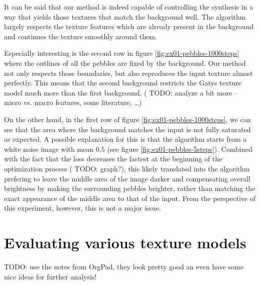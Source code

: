 It can be said that our method is indeed capable of controlling the synthesis in a way that yields those textures that match the background well. The algorithm largely respects the texture features which are already present in the background and continues the texture smoothly around them. 

Especially interesting is the second row in figure \ref{fig:ex01-pebbles-1000steps} where the outlines of all the pebbles are fixed by the background. Our method not only respects those boundaries, but also reproduces the input texture almost perfectly. This means that the second background restricts the Gatys texture model much more than the first background. ({\color{red} TODO: analyze a bit more -- micro vs. macro features, some literature, \dots})

On the other hand, in the first row of figure \ref{fig:ex01-pebbles-1000steps}, we can see that the area where the background matches the input is not fully saturated as expected. A possible explanation for this is that the algorithm starts from a white noise image with mean \(0.5\) (see figure \ref{fig:ex01-pebbles-5steps}). Combined with the fact that the loss decreases the fastest at the beginning of the optimization process ({\color{red} TODO: graph?}), this likely translated into the algorithm prefering to leave the middle area of the image darker and compensating overall brightness by making the surrounding pebbles brighter, rather than matching the exact appearance of the middle area to that of the input. From the perspective of this experiment, however, this is not a major issue.

\section{Evaluating various texture models}
\label{section:results-experiments-02}

{\color{red} TODO: use the notes from OrgPad, they look pretty good an even have some nice ideas for further analysis!}



